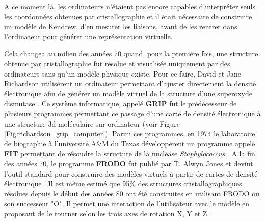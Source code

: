 A ce moment là, les ordinateurs n'étaient pas encore capables d'interpréter seuls les coordonnées obtenues par cristallographie et il était nécessaire de construire un modèle de Kendrew, d'en mesurer les liaisons, avant de les rentrer dans l'ordinateur pour générer une représentation virtuelle.

Cela changea au milieu des années 70 quand, pour la première fois, une structure obtenue par cristallographie fut résolue et visualisée uniquement par des ordinateurs sans qu'un modèle physique existe. Pour ce faire, David et Jane Richardson utilisèrent un ordinateur permettant d'ajuster directement la densité électronique afin de générer un modèle virtuel de la structure d'une superoxyde dismutase \cite{tainer1982determination}. Ce système informatique, appelé \textbf{GRIP} fut le prédécesseur de plusieurs programmes permettant ce passage d'une carte de densité électronique à une structure 3d moléculaire sur ordinateur (voir Figure \ref{Fig:richardson_grip_computer}). Parmi ces programmes, en 1974 le laboratoire de biographie à l'université A\&M du Texas développèrent un programme appelé \textbf{FIT} permettant de résoudre la structure de la nucléase \textit{Staphylococcus} \cite{collins1975protein}. A la fin des années 70, le programme \textbf{FRODO} fut publié par T. Alwyn Jones et devint l'outil standard pour construire des modèles virtuels à partir de cartes de densité électronique \cite{jones1978graphics}. Il est même estimé que 95\% des structures cristallographiques résolues depuis le début des années 80 ont été construites en utilisant FRODO ou son successeur "O". Il permet une interaction de l'utilisateur avec le modèle en proposant de le tourner selon les trois axes de rotation X, Y et Z.

